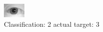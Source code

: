 \begin{figure}[h!]
\begin{center}
\includegraphics[width=0.60\columnwidth]{figures/ID1197_class_2_target_3.png}
\end{center}
\caption{ Classification: 2 actual target: 3}
\label{fig:ID1197_class_2_target_3}
\end{figure}
